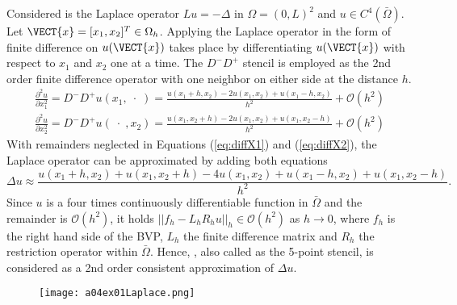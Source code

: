\newcommand{\assignmentDate}{November 18th, 2019}



Considered is the Laplace operator $Lu = -\Delta$ in $\Omega = (0, L)^2$ and $u \in C^4(\bar{\Omega})$.
%
\newcommand{\bigO}[1]{\mathcal{O}(#1)}
\newcommand{\fixDot}{\;\cdot\;}
Let $\VECT{x} = [x_1, x_2]^T \in \Omega_h$.
Applying the Laplace operator in the form of finite difference on $u(\VECT{x})$ takes place by differentiating $u(\VECT{x})$ with respect to $x_1$ and $x_2$ one at a time.
The $D^-D^+$ stencil is employed as the 2nd order finite difference operator with one neighbor on either side at the distance $h$.
\begin{align}
	\label{eq:diffX1}
	\frac{\partial^2u}{\partial x_1 ^2} = D^-D^+u(x_1 ,\fixDot) = \frac{u(x_1 + h, x_2) - 2u(x_1, x_2) + u(x_1 - h, x_2)}{h^2} + \bigO{h^2}\\
	\label{eq:diffX2}
	\frac{\partial^2u}{\partial x_2 ^2} = D^-D^+u(\fixDot, x_2) = \frac{u(x_1, x_2 + h) - 2u(x_1, x_2) + u(x_1, x_2 - h)}{h^2} + \bigO{h^2}
\end{align}
With remainders neglected in Equations (\ref{eq:diffX1}) and (\ref{eq:diffX2}), the Laplace operator can be approximated by adding both equations
\begin{equation}
	\label{eq:deltaU}
	\Delta u \approx \frac{u(x_1 + h, x_2) + u(x_1, x_2 + h) - 4u(x_1, x_2) + u(x_1 - h, x_2) + u(x_1, x_2 - h)}{h^2} \text{.}
 \end{equation}
Since $u$ is a four times continuously differentiable function in $\bar{\Omega}$ and the remainder is $\bigO{h^2}$, it holds $|| f_h -L_h R_h u||_{h} \in \bigO{h^2}$ as $h\rightarrow 0$, where $f_h$ is the right hand side of the BVP, $L_h$ the finite difference matrix and $R_h$ the restriction operator within $\bar{\Omega}$.
Hence, , also called as the 5-point stencil, is considered as a 2nd order consistent approximation of $\Delta u$.
%

%

%
\begin{figure}[H]
	\texttt{[image: a04ex01Laplace.png]} 
	\label{fig:a04ex01Laplace}
\end{figure}

